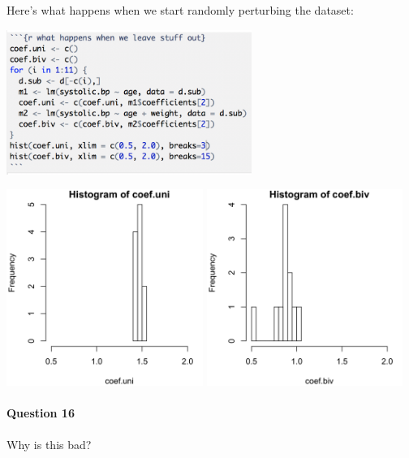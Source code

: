 \newpage

Here's what happens when we start randomly perturbing the dataset:

\begin{center}
\includegraphics[width=0.6\textwidth]{img/coef-perturb-code.png}
\end{center}

\begin{center}
\includegraphics[width=0.48\textwidth]{img/coef-uni.png}
\includegraphics[width=0.48\textwidth]{img/coef-biv.png}
\end{center}

\paragraph{Question 16} Why is this bad?

